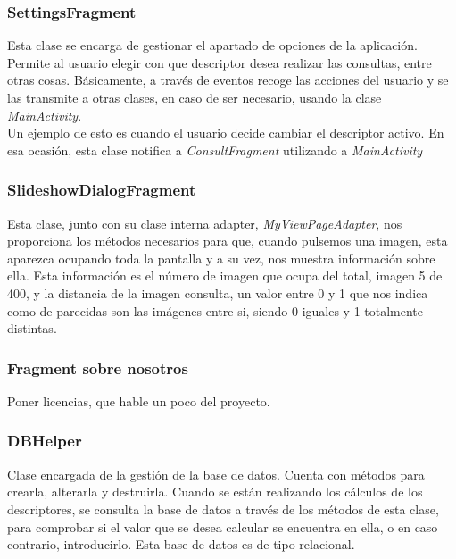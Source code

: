 \subsubsection{SettingsFragment}

Esta clase se encarga de gestionar el apartado de opciones de la aplicación. Permite al usuario elegir con que descriptor desea realizar las consultas, entre otras cosas. Básicamente, a través de eventos recoge las acciones del usuario y se las transmite a otras clases, en caso de ser necesario, usando la clase \textit{MainActivity}.\\

Un ejemplo de esto es cuando el usuario decide cambiar el descriptor activo. En esa ocasión, esta clase notifica a \textit{ConsultFragment} utilizando a \textit{MainActivity}

\subsubsection{SlideshowDialogFragment}

Esta clase, junto con su clase interna adapter, \textit{MyViewPageAdapter}, nos proporciona los métodos necesarios para que, cuando pulsemos una imagen, esta aparezca ocupando toda la pantalla y a su vez, nos muestra información sobre ella. Esta información es el número de imagen que ocupa del total, imagen 5 de 400, y la distancia de la imagen consulta, un valor entre 0 y 1 que nos indica como de parecidas son las imágenes entre si, siendo 0 iguales y 1 totalmente distintas.

\subsubsection{Fragment sobre nosotros}

Poner licencias, que hable un poco del proyecto.
 
\subsubsection{DBHelper}

Clase encargada de la gestión de la base de datos. Cuenta con métodos para crearla, alterarla y destruirla. Cuando se están realizando los cálculos de los descriptores, se consulta la base de datos a través de los métodos de esta clase, para comprobar si el valor que se desea calcular se encuentra en ella, o en caso contrario, introducirlo. Esta base de datos es de tipo relacional.

